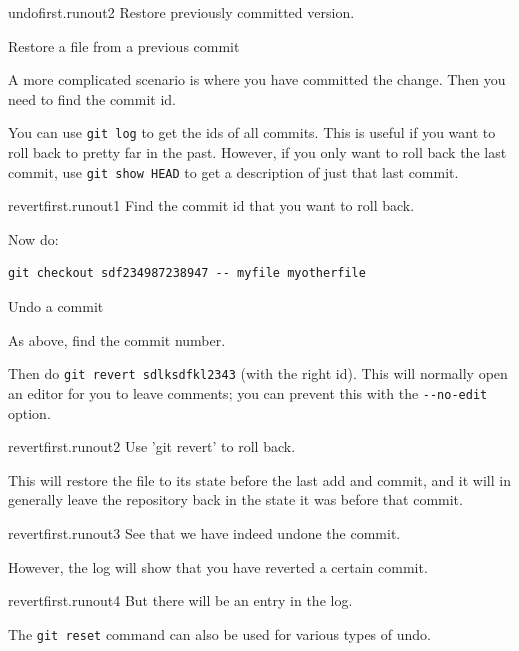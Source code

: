 \begin{gitstep}{undofirst.runout2}
  Restore previously committed version.
\end{gitstep}

\newpage
{} {Restore a file from a previous commit}

A more complicated scenario is where you have committed the change.
Then you need to find the commit id.

You can use \lstinline{git log} to get the ids of all commits.
This is useful if you want to roll back to pretty far in the past.
However, if you only want to roll back the last commit,
use \lstinline{git show HEAD} to get a description of just that last commit.

\begin{gitstep}{revertfirst.runout1}
  Find the commit id that you want to roll back.
\end{gitstep}

Now do:
\begin{lstlisting}
git checkout sdf234987238947 -- myfile myotherfile
\end{lstlisting}

\newpage
{} {Undo a commit}

As above, find the commit number.

Then do \lstinline{git revert sdlksdfkl2343} (with the right id).
This will normally open an editor for you to leave comments;
you can prevent this with the \lstinline{--no-edit} option.

\begin{gitstep}{revertfirst.runout2}
  Use 'git revert' to roll back.
\end{gitstep}

This will restore the file to its state before the last
add and commit, and it will in generally leave the repository back
in the state it was before that commit.

\begin{gitstep}{revertfirst.runout3}
  See that we have indeed undone the commit.
\end{gitstep}

However, the log will show that you have reverted a certain commit.

\begin{gitstep}{revertfirst.runout4}
  But there will be an entry in the log.
\end{gitstep}

The \lstinline{git reset} command can also be used for various
types of undo.

